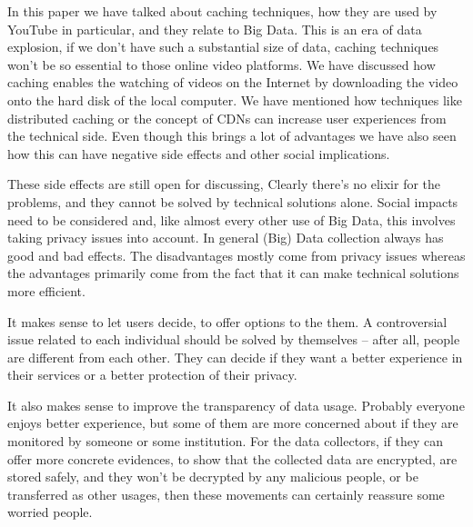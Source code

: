 In this paper we have talked about caching techniques, how they are used by YouTube in particular, and they relate to Big Data. This is an era of data explosion, if we don't have such a substantial size of data, caching techniques won't be so essential to those online video platforms. We have discussed how caching enables the watching of videos on the Internet by downloading the video onto the hard disk of the local computer. We have mentioned how techniques like distributed caching or the concept of CDNs can increase user experiences from the technical side. Even though this brings a lot of advantages we have also seen how this can have negative side effects and other social implications.

These side effects are still open for discussing, Clearly there's no elixir for the problems, and they  cannot be solved by technical solutions alone. Social impacts need to be considered and, like almost every other use of Big Data, this involves taking privacy issues into account. In general (Big) Data collection always has good and bad effects. The disadvantages mostly come from privacy issues whereas the advantages primarily come from the fact that it can make technical solutions more efficient. 

It makes sense to let users decide, to offer options to the them. A controversial issue related to each individual should be solved by themselves -- after all, people are different from each other. They can decide if they want a better experience in their services or a better protection of their privacy.  

It also makes sense to improve the transparency of data usage. Probably everyone enjoys better experience, but some of them are more concerned about if they are monitored by someone or some institution. For the data collectors, if they can offer more concrete evidences, to show that the collected data are encrypted, are stored safely, and they won't be decrypted by any malicious people, or be transferred as other usages, then these movements can certainly reassure some worried people.


